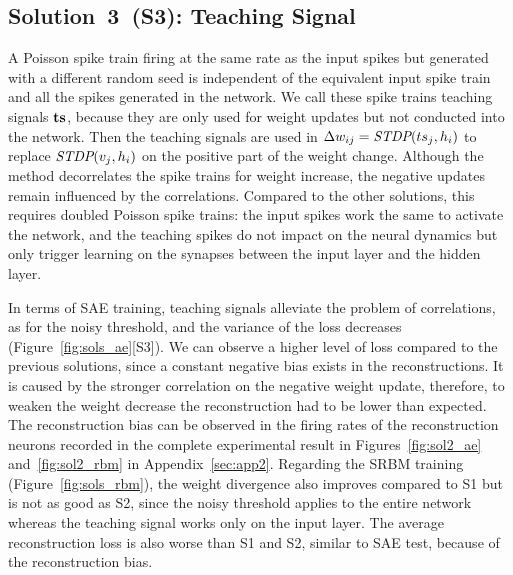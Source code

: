 \subsection{Solution~3~(S3): Teaching Signal}
A Poisson spike train firing at the same rate as the input spikes but generated with a different random seed is independent of the equivalent input spike train and all the spikes generated in the network.
We call these spike trains teaching signals $\bf{ts}$, because they are only used for weight updates but not conducted into the network.
Then the teaching signals are used in $\Delta w_{ij} = \textit{\textrm{STDP}}(ts_j,h_i)$ to replace $\textit{\textrm{STDP}}(v_j,h_i)$ on the positive part of the weight change.
Although the method decorrelates the spike trains for weight increase, the negative updates remain influenced by the correlations.  
Compared to the other solutions, this requires doubled Poisson spike trains: the input spikes work the same to activate the network, and the teaching spikes do not impact on the neural dynamics but only trigger learning on the synapses between the input layer and the hidden layer.

In terms of SAE training, teaching signals alleviate the problem of correlations, as for the noisy threshold, and the variance of the loss decreases (Figure~\ref{fig:sols_ae}[S3]).
We can observe a higher level of loss compared to the previous solutions, since a constant negative bias exists in the reconstructions.
It is caused by the stronger correlation on the negative weight update, therefore, to weaken the weight decrease the reconstruction had to be lower than expected.  
The reconstruction bias can be observed in the firing rates of the reconstruction neurons recorded in the complete experimental result in Figures~\ref{fig:sol2_ae} and~\ref{fig:sol2_rbm} in Appendix~\ref{sec:app2}.
Regarding the SRBM training (Figure~\ref{fig:sols_rbm}), the weight divergence also improves compared to S1 but is not as good as S2, since the noisy threshold applies to the entire network whereas the teaching signal works only on the input layer.
The average reconstruction loss is also worse than S1 and S2, similar to SAE test, because of the reconstruction bias. 

